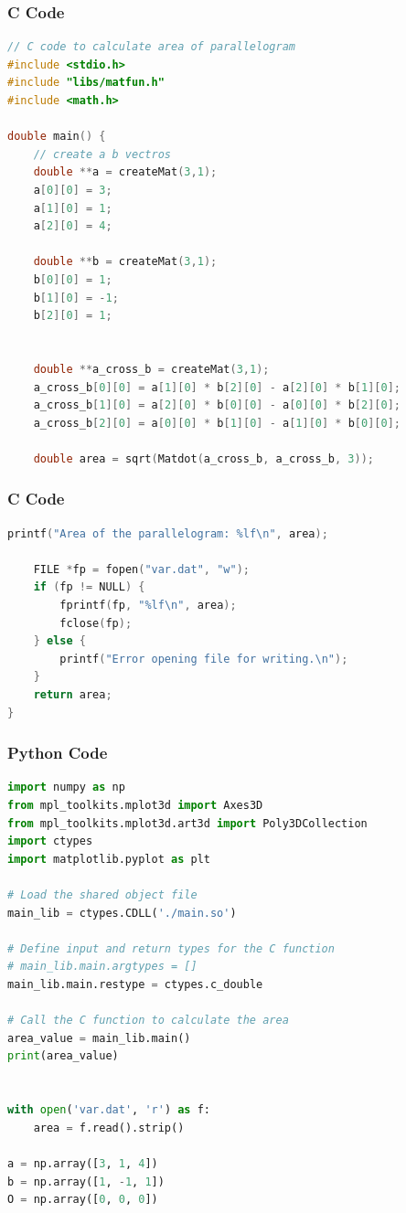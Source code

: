 \documentclass{beamer}
\begin{document}
\begin{frame}[fragile]
    \frametitle{C Code}
    \begin{lstlisting}[language=C]
// C code to calculate area of parallelogram
#include <stdio.h>
#include "libs/matfun.h"
#include <math.h>

double main() {
    // create a b vectros 
    double **a = createMat(3,1);
    a[0][0] = 3;
    a[1][0] = 1;
    a[2][0] = 4;

    double **b = createMat(3,1);
    b[0][0] = 1;
    b[1][0] = -1;
    b[2][0] = 1;


    double **a_cross_b = createMat(3,1);
    a_cross_b[0][0] = a[1][0] * b[2][0] - a[2][0] * b[1][0];
    a_cross_b[1][0] = a[2][0] * b[0][0] - a[0][0] * b[2][0];
    a_cross_b[2][0] = a[0][0] * b[1][0] - a[1][0] * b[0][0];

    double area = sqrt(Matdot(a_cross_b, a_cross_b, 3));
\end{lstlisting}
\end{frame}


\begin{frame}[fragile]
    \frametitle{C Code}
    \begin{lstlisting}[language=C]
    printf("Area of the parallelogram: %lf\n", area);

    FILE *fp = fopen("var.dat", "w");
    if (fp != NULL) {
        fprintf(fp, "%lf\n", area);
        fclose(fp);
    } else {
        printf("Error opening file for writing.\n");
    }
    return area;
}
\end{lstlisting}
\end{frame}
    
\begin{frame}[fragile]
    \frametitle{Python Code}
    \begin{lstlisting}[language=Python]
import numpy as np 
from mpl_toolkits.mplot3d import Axes3D
from mpl_toolkits.mplot3d.art3d import Poly3DCollection
import ctypes
import matplotlib.pyplot as plt

# Load the shared object file
main_lib = ctypes.CDLL('./main.so')

# Define input and return types for the C function
# main_lib.main.argtypes = []
main_lib.main.restype = ctypes.c_double

# Call the C function to calculate the area
area_value = main_lib.main()
print(area_value)


with open('var.dat', 'r') as f:
	area = f.read().strip()

a = np.array([3, 1, 4])
b = np.array([1, -1, 1])
O = np.array([0, 0, 0])
\end{lstlisting}
\end{frame}
\end{document}
